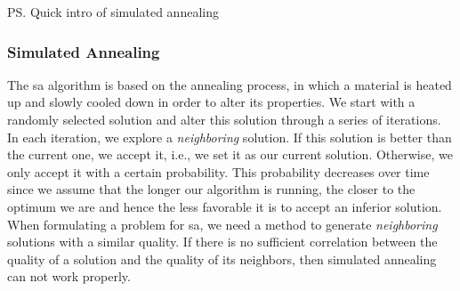 \ps{Quick intro of simulated annealing}

\subsubsection{Simulated Annealing}
\label{sssec:back-opt-sa}

The \gls{sa} algorithm is based on the annealing process, in which a material is heated up and slowly cooled down in order to alter its properties.
We start with a randomly selected solution and alter this solution through a series of iterations.
In each iteration, we explore a \textit{neighboring} solution.
If this solution is better than the current one, we accept it, i.e., we set it as our current solution.
Otherwise, we only accept it with a certain probability. 
This probability decreases over time since we assume that the longer our algorithm is running, the closer to the optimum we are and hence the less favorable it is to accept an inferior solution.
When formulating a problem for \gls{sa}, we need a method to generate \textit{neighboring} solutions with a similar quality.
If there is no sufficient correlation between the quality of a solution and the quality of its neighbors, then simulated annealing can not work properly.



